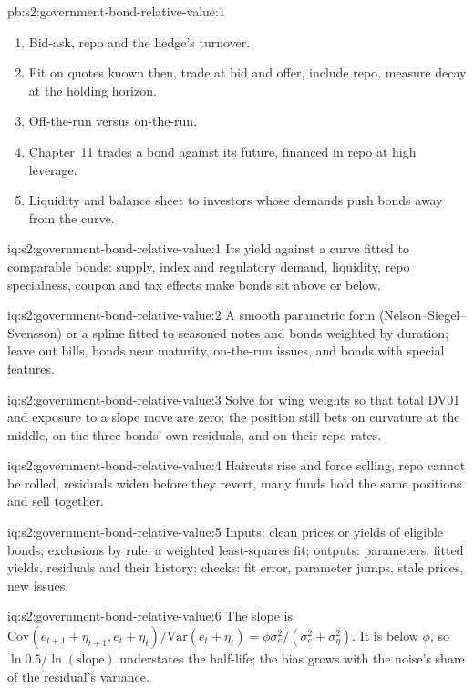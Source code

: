 \begin{solution}{pb:s2:government-bond-relative-value:1}
\begin{enumerate}
\item Bid-ask, repo and the hedge's turnover.
\item Fit on quotes known then, trade at bid and offer, include repo, measure decay at the holding horizon.
\item Off-the-run versus on-the-run.
\item Chapter~11 trades a bond against its future, financed in repo at high leverage.
\item Liquidity and balance sheet to investors whose demands push bonds away from the curve.
\end{enumerate}
\end{solution}

\begin{solution}{iq:s2:government-bond-relative-value:1}
Its yield against a curve fitted to comparable bonds: supply, index and regulatory demand, liquidity, repo specialness, coupon and tax effects make
bonds sit above or below.
\end{solution}

\begin{solution}{iq:s2:government-bond-relative-value:2}
A smooth parametric form (Nelson--Siegel--Svensson) or a spline fitted to seasoned notes and bonds weighted by duration; leave out bills, bonds near
maturity, on-the-run issues, and bonds with special features.
\end{solution}

\begin{solution}{iq:s2:government-bond-relative-value:3}
Solve for wing weights so that total DV01 and exposure to a slope move are zero; the position still bets on curvature at the middle, on the three
bonds' own residuals, and on their repo rates.
\end{solution}

\begin{solution}{iq:s2:government-bond-relative-value:4}
Haircuts rise and force selling, repo cannot be rolled, residuals widen before they revert, many funds hold the same positions and sell together.
\end{solution}

\begin{solution}{iq:s2:government-bond-relative-value:5}
Inputs: clean prices or yields of eligible bonds; exclusions by rule; a weighted least-squares fit; outputs: parameters, fitted yields, residuals
and their history; checks: fit error, parameter jumps, stale prices, new issues.
\end{solution}

\begin{solution}{iq:s2:government-bond-relative-value:6}
The slope is $\mathrm{Cov}(e_{t+1} + \eta_{t+1}, e_t + \eta_t)/\mathrm{Var}(e_t + \eta_t) = \phi\sigma_e^2/(\sigma_e^2 + \sigma_\eta^2)$. It is below
$\phi$, so $\ln 0.5/\ln(\text{slope})$ understates the half-life; the bias grows with the noise's share of the residual's variance.
\end{solution}
